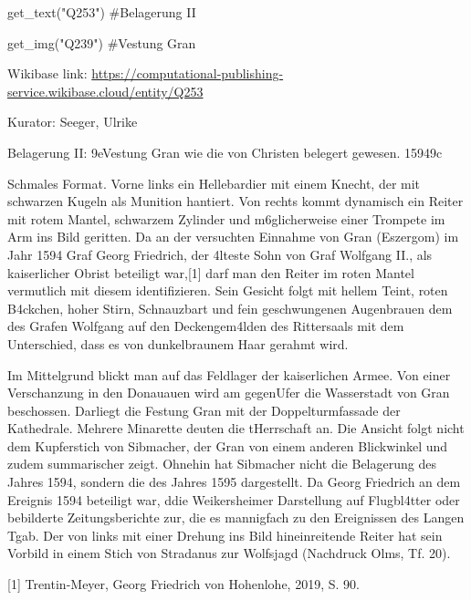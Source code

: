 \documentclass[
  letterpaper,
]{book}
\newenvironment{Shaded}{\begin{snugshade}}{\end{snugshade}}
\newcommand{\CommentTok}[1]{\textcolor[rgb]{0.37,0.37,0.37}{#1}}
\newcommand{\NormalTok}[1]{\textcolor[rgb]{0.00,0.23,0.31}{#1}}
\newcommand{\StringTok}[1]{\textcolor[rgb]{0.13,0.47,0.30}{#1}}
\begin{document}
\begin{Shaded}
\begin{Highlighting}[]
\NormalTok{get\_text(}\StringTok{"Q253"}\NormalTok{)}
\CommentTok{\#Belagerung II}

\NormalTok{get\_img(}\StringTok{"Q239"}\NormalTok{)}
\CommentTok{\#Vestung Gran}
\end{Highlighting}
\end{Shaded}

Wikibase link:
\url{https://computational-publishing-service.wikibase.cloud/entity/Q253}

Kurator: Seeger, Ulrike

Belagerung II: \x9eVestung Gran wie die von Christen belegert
gewesen. 1594\x9c

Schmales Format. Vorne links ein Hellebardier mit einem Knecht, der mit
schwarzen Kugeln als Munition hantiert. Von rechts kommt dynamisch ein
Reiter mit rotem Mantel, schwarzem Zylinder und m\xb6glicherweise
einer Trompete im Arm ins Bild geritten. Da an der versuchten Einnahme
von Gran (Eszergom) im Jahr 1594 Graf Georg Friedrich, der
\xa4lteste Sohn von Graf Wolfgang II., als kaiserlicher Obrist
beteiligt war,{[}1{]} darf man den Reiter im roten Mantel vermutlich mit
diesem identifizieren. Sein Gesicht folgt mit hellem Teint, roten
B\xa4ckchen, hoher Stirn, Schnauzbart und fein geschwungenen
Augenbrauen dem des Grafen Wolfgang auf den Deckengem\xa4lden des
Rittersaals mit dem Unterschied, dass es von dunkelbraunem Haar gerahmt
wird.

Im Mittelgrund blickt man auf das Feldlager der kaiserlichen Armee. Von
einer Verschanzung in den Donauauen wird am
gegen\xbcberliegenden Ufer die Wasserstadt von Gran beschossen.
Dar\xbcber liegt die Festung Gran mit der Doppelturmfassade der
Kathedrale. Mehrere Minarette deuten die t\xbcrkische Herrschaft an.
Die Ansicht folgt nicht dem Kupferstich von Sibmacher, der Gran von
einem anderen Blickwinkel und zudem summarischer zeigt. Ohnehin hat
Sibmacher nicht die Belagerung des Jahres 1594, sondern die des Jahres
1595 dargestellt. Da Georg Friedrich an dem Ereignis 1594 beteiligt war,
d\xbcrfte die Weikersheimer Darstellung auf Flugbl\xa4tter oder
bebilderte Zeitungsberichte zur\xbcckgehen, die es mannigfach zu den
Ereignissen des Langen T\xbcrkenkriegs gab. Der von links mit einer
Drehung ins Bild hineinreitende Reiter hat sein Vorbild in einem Stich
von Stradanus zur Wolfsjagd (Nachdruck Olms, Tf. 20).

{[}1{]} Trentin-Meyer, Georg Friedrich von Hohenlohe, 2019, S. 90.
\end{document}
